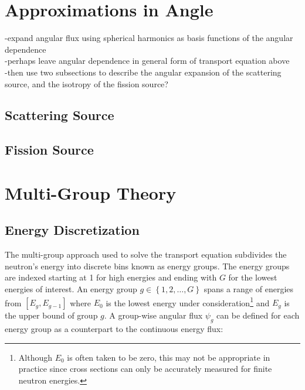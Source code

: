 \section{Approximations in Angle}
\label{sec:chap2-angule}

-expand angular flux using spherical harmonics as basis functions of the angular dependence\\
-perhaps leave angular dependence in general form of transport equation above\\
-then use two subsections to describe the angular expansion of the scattering source, and the isotropy of the fission source?\\

\subsection{Scattering Source}
\label{subsec:chap2-scatt-src}

\subsection{Fission Source}
\label{subsec:chap2-fiss-src}


\section{Multi-Group Theory}
\label{sec:chap2-mg-theory}

\subsection{Energy Discretization}
\label{sec:chap2-energy}

The multi-group approach used to solve the transport equation subdivides the neutron's energy into discrete bins known as energy groups. The energy groups are indexed starting at 1 for high energies and ending with $G$ for the lowest energies of interest. An energy group $g \in \left\{1, 2, \ldots, G\right\}$  spans a range of energies from $\left[E_{g}, E_{g-1}\right]$ where $E_{0}$ is the lowest energy under consideration\footnote{Although $E_{0}$ is often taken to be zero, this may not be appropriate in practice since cross sections can only be accurately measured for finite neutron energies.} and $E_{g}$ is the upper bound of group $g$. A group-wise angular flux $\psi_{g}$ can be defined for each energy group as a counterpart to the continuous energy flux:

